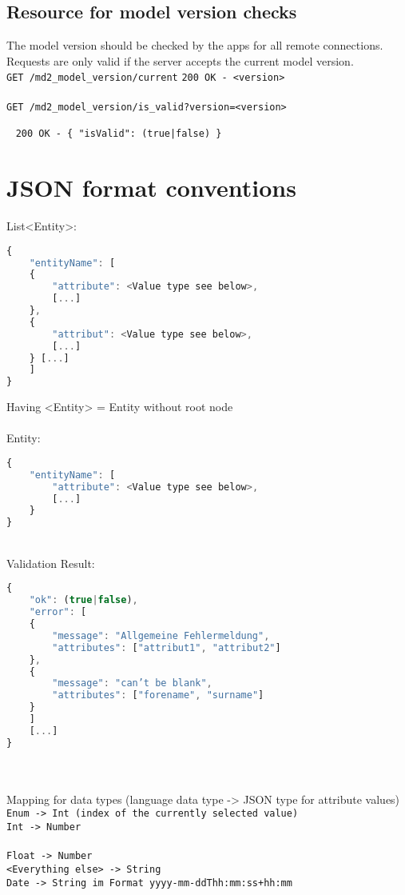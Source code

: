 \subsection*{Resource for model version checks}
The model version should be checked by the apps for all remote connections. Requests are only valid if the server accepts the current model version. \\
\lstinline|GET /md2_model_version/current| \hfill \lstinline|200 OK - <version>| \\
\\
\lstinline|GET /md2_model_version/is_valid?version=<version>| 

~ \hfill \lstinline!200 OK - { "isValid": (true|false) }!


\section{JSON format conventions}
List<Entity>:
\begin{lstlisting}[language=Javascript]
{
	"entityName": [
	{
		"attribute": <Value type see below>,
		[...]
	},
	{
		"attribut": <Value type see below>,
		[...]
	} [...]
	]
}
\end{lstlisting}
Having <Entity> = Entity without root node
\\
\\
Entity:
\begin{lstlisting}[language=Javascript]
{
	"entityName": [
		"attribute": <Value type see below>,
		[...]
	}
}
\end{lstlisting}
~
\\
Validation Result:
\begin{lstlisting}[language=Javascript]
{
	"ok": (true|false),
	"error": [
	{
		"message": "Allgemeine Fehlermeldung",
		"attributes": ["attribut1", "attribut2"]
	},
	{
		"message": "can’t be blank",
		"attributes": ["forename", "surname"]
	}
	]
	[...]
}
\end{lstlisting}
~
\\ \\
Mapping for data types (language data type -> JSON type for attribute values) \\
\lstinline|Enum -> Int (index of the currently selected value)| \\
\lstinline|Int -> Number|	
\\ \\
\lstinline|Float -> Number| \\
\lstinline|<Everything else> -> String| \\
\lstinline|Date -> String im Format yyyy-mm-ddThh:mm:ss+hh:mm| \\


